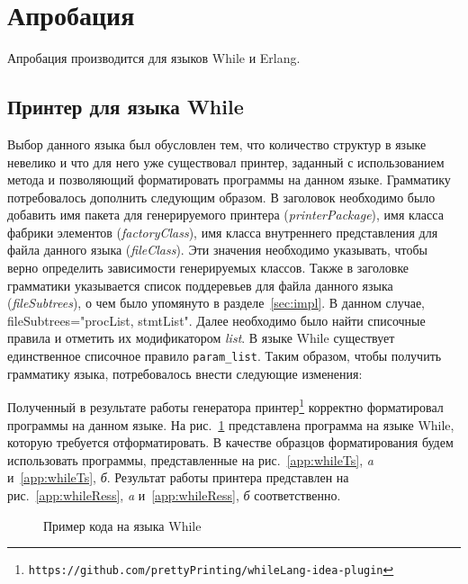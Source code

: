 \section{Апробация}
Апробация производится для языков While и Erlang. 
\subsection{Принтер для языка While}
Выбор данного языка был обусловлен тем, что количество структур в языке невелико  и что для него уже существовал принтер, заданный с использованием метода \cite{paper:while} и позволяющий форматировать программы на данном языке.
Грамматику потребовалось дополнить следующим образом.
В заголовок необходимо было добавить имя пакета для генерируемого принтера (\emph{printerPackage}), имя класса фабрики элементов (\emph{factoryClass}), имя класса внутреннего представления для файла данного языка (\emph{fileClass}).
Эти значения необходимо указывать, чтобы верно определить зависимости генерируемых классов.
Также в заголовке грамматики указывается список поддеревьев для файла данного языка (\emph{fileSubtrees}), о чем было упомянуто в разделе~\ref{sec:impl}.
В данном случае, fileSubtrees="procList, stmtList".
Далее необходимо было найти списочные правила и отметить их модификатором \emph{list}.
В языке While существует единственное списочное правило \lstinline[basicstyle=\normalsize\ttfamily, columns=fullflexible]{param_list}.
Таким образом, чтобы получить грамматику языка, потребовалось внести следующие изменения:
{
    
}
\noindent
Полученный в результате работы генератора принтер\footnote{\texttt{https://github.com/prettyPrinting/whileLang-idea-plugin}} корректно форматировал программы на данном языке.
На рис.~\ref{app:whileEx} представлена программа на языке While, которую требуется отформатировать.
В качестве образцов форматирования будем использовать программы, представленные на рис.~\ref{app:whileTs}, \emph{a} и~\ref{app:whileTs}, \emph{б}.
Результат работы принтера представлен на рис.~\ref{app:whileRess}, \emph{a} и~\ref{app:whileRess}, \emph{б} соответственно.

\begin{figure}[h]
    \centering
    
    \caption{Пример кода на языка While}
    \label{app:whileEx}
\end{figure}


